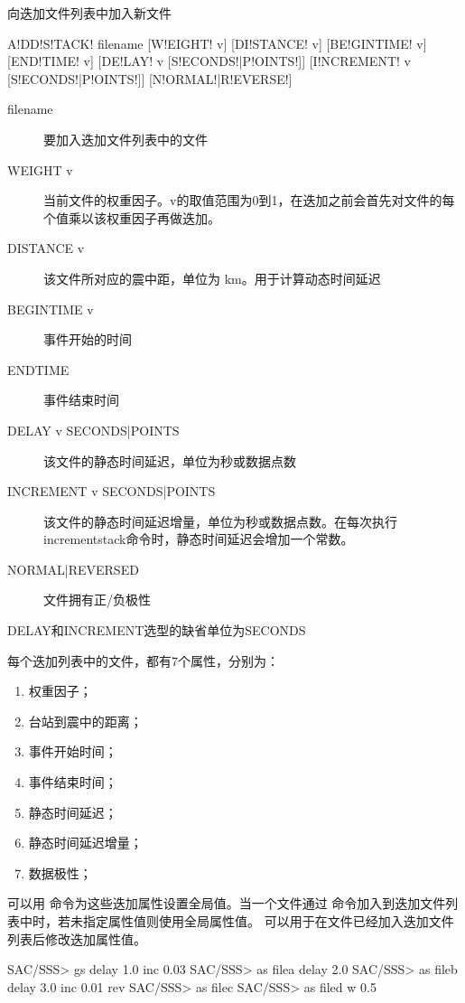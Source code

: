 \label{sss:addstack}

向迭加文件列表中加入新文件

\begin{SACSTX}
A!DD!S!TACK! filename [W!EIGHT! v] [DI!STANCE! v]
    [BE!GINTIME! v] [END!TIME! v]
    [DE!LAY! v [S!ECONDS!|P!OINTS!]]
    [I!NCREMENT! v [S!ECONDS!|P!OINTS!]]
    [N!ORMAL!|R!EVERSE!]
\end{SACSTX}

\begin{description}
\item [filename] 要加入迭加文件列表中的文件
\item [WEIGHT v] 当前文件的权重因子。v的取值范围为0到1，在迭加之前会首先对文件的每个值乘以该权重因子再做迭加。
\item [DISTANCE v] 该文件所对应的震中距，单位为 \si{\km}。用于计算动态时间延迟
\item [BEGINTIME v] 事件开始的时间
\item [ENDTIME] 事件结束时间
\item [DELAY v SECONDS|POINTS] 该文件的静态时间延迟，单位为秒或数据点数
\item [INCREMENT v SECONDS|POINTS] 该文件的静态时间延迟增量，单位为秒或数据点数。在每次执行incrementstack命令时，静态时间延迟会增加一个常数。
\item [NORMAL|REVERSED] 文件拥有正/负极性
\end{description}

DELAY和INCREMENT选型的缺省单位为SECONDS

每个迭加列表中的文件，都有7个属性，分别为：
\begin{enumerate}
\item 权重因子；
\item 台站到震中的距离；
\item 事件开始时间；
\item 事件结束时间；
\item 静态时间延迟；
\item 静态时间延迟增量；
\item 数据极性；
\end{enumerate}

可以用  命令为这些迭加属性设置全局值。当一个文件通过
  命令加入到迭加文件列表中时，若未指定属性值则使用全局属性值。
  可以用于在文件已经加入迭加文件列表后修改迭加属性值。

\begin{SACCode}
SAC/SSS> gs delay 1.0 inc 0.03
SAC/SSS> as filea delay 2.0
SAC/SSS> as fileb delay 3.0 inc 0.01 rev
SAC/SSS> as filec
SAC/SSS> as filed w 0.5
\end{SACCode}

